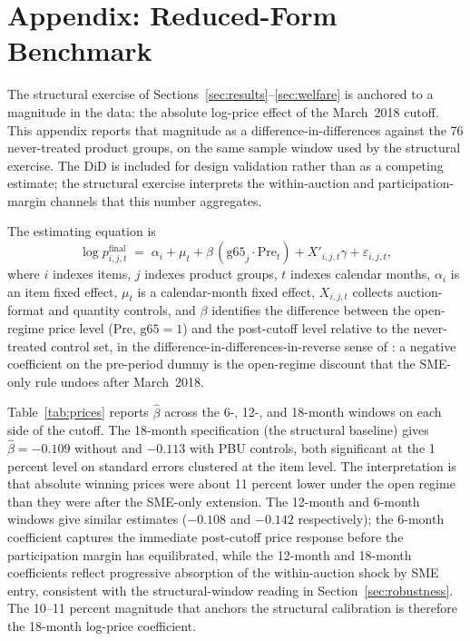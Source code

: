 \section{Appendix: Reduced-Form Benchmark}\label{app:did}

The structural exercise of Sections~\ref{sec:results}--\ref{sec:welfare} is anchored to a magnitude in the data: the absolute log-price effect of the March~2018 cutoff. This appendix reports that magnitude as a difference-in-differences against the 76 never-treated product groups, on the same sample window used by the structural exercise. The DiD is included for design validation rather than as a competing estimate; the structural exercise interprets the within-auction and participation-margin channels that this number aggregates.

The estimating equation is
\begin{equation}\label{eq:did}
\log p^{\mathrm{final}}_{i,j,t} \;=\; \alpha_i + \mu_t + \beta \, (\mathrm{g65}_j \cdot \text{Pre}_t) + X'_{i,j,t} \gamma + \varepsilon_{i,j,t},
\end{equation}
where $i$ indexes items, $j$ indexes product groups, $t$ indexes calendar months, $\alpha_i$ is an item fixed effect, $\mu_t$ is a calendar-month fixed effect, $X_{i,j,t}$ collects auction-format and quantity controls, and $\beta$ identifies the difference between the open-regime price level (Pre, $\mathrm{g65}=1$) and the post-cutoff level relative to the never-treated control set, in the difference-in-differences-in-reverse sense of \citet{kim2019}: a negative coefficient on the pre-period dummy is the open-regime discount that the SME-only rule undoes after March~2018.



Table~\ref{tab:prices} reports $\hat\beta$ across the 6-, 12-, and 18-month windows on each side of the cutoff. The 18-month specification (the structural baseline) gives $\hat\beta = -0.109$ without and $-0.113$ with PBU controls, both significant at the 1 percent level on standard errors clustered at the item level. The interpretation is that absolute winning prices were about 11 percent lower under the open regime than they were after the SME-only extension. The 12-month and 6-month windows give similar estimates ($-0.108$ and $-0.142$ respectively); the 6-month coefficient captures the immediate post-cutoff price response before the participation margin has equilibrated, while the 12-month and 18-month coefficients reflect progressive absorption of the within-auction shock by SME entry, consistent with the structural-window reading in Section~\ref{sec:robustness}. The 10--11 percent magnitude that anchors the structural calibration is therefore the 18-month log-price coefficient.

